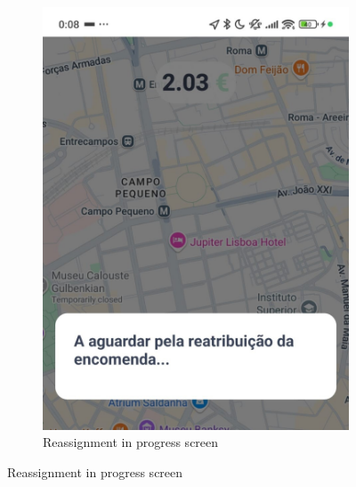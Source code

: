 \begin{figure}[H]
\begin{subfigure}[b]{0.47\textwidth}
        \includegraphics[width=\textwidth]{images/CancelReassignment.jpeg}
        \caption{Reassignment in progress screen}
        \label{fig:cancel_reassignment}
    \end{subfigure}
    
    \vspace{0.3cm} %


\end{figure}
